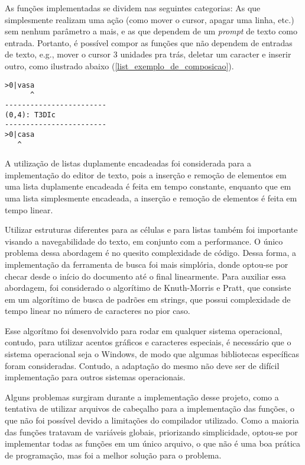 \documentclass[a4paper, 11pt]{article}
\begin{document}
As funções implementadas se dividem nas seguintes categorias: As que simplesmente realizam uma ação (como mover o cursor, apagar uma linha, etc.) sem nenhum parâmetro a mais, e as que dependem de um \textit{prompt} de texto como entrada. Portanto, é possível compor as funções que não dependem de entradas de texto, e.g., mover o cursor 3 unidades pra trás, deletar um caracter e inserir outro, como ilustrado abaixo (\ref{list_exemplo_de_composicao}).

\begin{lstlisting}[caption={Exemplo de composição de funções}, label={list_exemplo_de_composicao}language={[ansi]C},firstnumber=1]
>0|vasa
      ^
------------------------
(0,4): T3DIc
------------------------
>0|casa
   ^
\end{lstlisting}

A utilização de listas duplamente encadeadas foi considerada para a implementação do editor de texto, pois a inserção e remoção de elementos em uma lista duplamente encadeada é feita em tempo constante, enquanto que em uma lista simplesmente encadeada, a inserção e remoção de elementos é feita em tempo linear. 

Utilizar estruturas diferentes para as células e para listas também foi importante visando a navegabilidade do texto, em conjunto com a performance. O único problema dessa abordagem é no quesito complexidade de código. Dessa forma, a implementação da ferramenta de busca foi mais simplória, donde optou-se por checar desde o início do documento até o final linearmente. Para auxiliar essa abordagem, foi considerado o algorítimo de Knuth-Morris e Pratt, que consiste em um algorítimo de busca de padrões em strings, que possui complexidade de tempo linear no número de caracteres no pior caso.

Esse algorítmo foi desenvolvido para rodar em qualquer sistema operacional, contudo, para utilizar acentos gráficos e caracteres especiais, é necessário que o sistema operacional seja o Windows, de modo que algumas bibliotecas específicas foram consideradas. Contudo, a adaptação do mesmo não deve ser de difícil implementação para outros sistemas operacionais.

Alguns problemas surgiram durante a implementação desse projeto, como a tentativa de utilizar arquivos de cabeçalho para a implementação das funções, o que não foi possível devido a limitações do compilador utilizado. Como a maioria das funções tratavam de variáveis globais, priorizando simplicidade, optou-se por implementar todas as funções em um único arquivo, o que não é uma boa prática de programação, mas foi a melhor solução para o problema.
\end{document}
